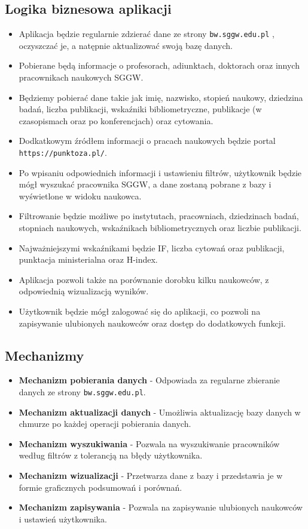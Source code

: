\documentclass{article}
\begin{document}
\subsection{Logika biznesowa aplikacji}
\begin{itemize}
  \item Aplikacja będzie regularnie zdzierać dane ze strony \texttt{bw.sggw.edu.pl} , oczyszczać je, a natępnie aktualizować swoją bazę danych.
  \item Pobierane będą informacje o profesorach, adiunktach, doktorach oraz innych pracownikach naukowych SGGW.
  \item Będziemy pobierać dane takie jak imię, nazwisko, stopień naukowy, dziedzina badań, liczba publikacji, wskaźniki bibliometryczne, publikacje (w czasopismach oraz po konferencjach) oraz cytowania.
  \item Dodkatkowym źródłem informacji o pracach naukowych będzie portal \texttt{https://punktoza.pl/}.
  \item Po wpisaniu odpowiednich informacji i ustawieniu filtrów, użytkownik będzie mógł wyszukać pracownika SGGW, a dane zostaną pobrane z bazy i wyświetlone w widoku naukowca.
  \item Filtrowanie będzie możliwe po instytutach, pracowniach, dziedzinach badań, stopniach naukowych, wskaźnikach bibliometrycznych oraz liczbie publikacji.
  \item Najważniejszymi wskaźnikami będzie IF, liczba cytowań oraz publikacji, punktacja ministerialna oraz H-index.
  \item Aplikacja pozwoli także na porównanie dorobku kilku naukowców, z odpowiednią wizualizacją wyników.
  \item Użytkownik będzie mógł zalogować się do aplikacji, co pozwoli na zapisywanie ulubionych naukowców oraz dostęp do dodatkowych funkcji.
\end{itemize}

\subsection{Mechanizmy}
\begin{itemize}
  \item \textbf{Mechanizm pobierania danych} - Odpowiada za regularne zbieranie danych ze strony \texttt{bw.sggw.edu.pl}.
  \item \textbf{Mechanizm aktualizacji danych} - Umożliwia aktualizację bazy danych w chmurze po każdej operacji pobierania danych.
  \item \textbf{Mechanizm wyszukiwania} - Pozwala na wyszukiwanie pracowników według filtrów z tolerancją na błędy użytkownika.
  \item \textbf{Mechanizm wizualizacji} - Przetwarza dane z bazy i przedstawia je w formie graficznych podsumowań i porównań.
  \item \textbf{Mechanizm zapisywania} - Pozwala na zapisywanie ulubionych naukowców i ustawień użytkownika.
\end{itemize}
\end{document}
